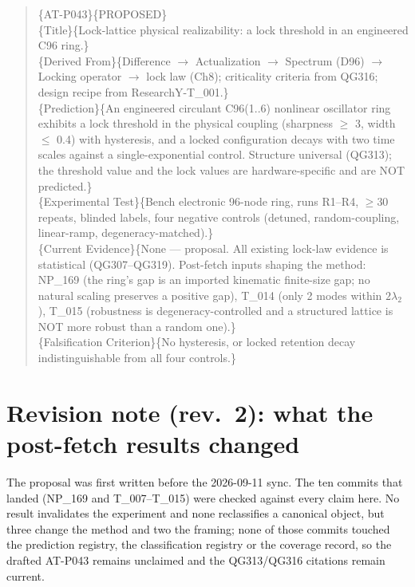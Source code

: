 \documentclass[11pt,a4paper]{article}
\begin{document}
\begin{quote}\raggedright\scriptsize\ttfamily
\string\predstart\{AT-P043\}\{PROPOSED\}\\
\string\pfield\{Title\}\{Lock-lattice physical realizability: a lock threshold in an engineered C96
ring.\}\\
\string\pfield\{Derived From\}\{Difference $\to$ Actualization $\to$ Spectrum (D96) $\to$ Locking
operator $\to$ lock law (Ch8); criticality criteria from QG316; design recipe from ResearchY-T\_001.\}\\
\string\pfield\{Prediction\}\{An engineered circulant C96(1..6) nonlinear oscillator ring exhibits a
lock threshold in the physical coupling (sharpness $\ge$ 3, width $\le$ 0.4) with hysteresis, and a
locked configuration decays with two time scales against a single-exponential control. Structure
universal (QG313); the threshold value and the lock values are hardware-specific and are NOT
predicted.\}\\
\string\pfield\{Experimental Test\}\{Bench electronic 96-node ring, runs R1--R4, $\ge$30 repeats,
blinded labels, four negative controls (detuned, random-coupling, linear-ramp,
degeneracy-matched).\}\\
\string\pfield\{Current Evidence\}\{None --- proposal. All existing lock-law evidence is statistical
(QG307--QG319). Post-fetch inputs shaping the method: NP\_169 (the ring's gap is an imported
kinematic finite-size gap; no natural scaling preserves a positive gap), T\_014 (only 2 modes within
$2\lambda_2$), T\_015 (robustness is degeneracy-controlled and a structured lattice is NOT more
robust than a random one).\}\\
\string\pfield\{Falsification Criterion\}\{No hysteresis, or locked retention decay
indistinguishable from all four controls.\}
\end{quote}

\section{Revision note (rev.\ 2): what the post-fetch results changed}

The proposal was first written before the 2026-09-11 sync. The ten commits that landed (NP\_169 and
T\_007--T\_015) were checked against every claim here. No result invalidates the experiment and none
reclassifies a canonical object, but three change the method and two the framing; none of those
commits touched the prediction registry, the classification registry or the coverage record, so the
drafted AT-P043 remains unclaimed and the QG313/QG316 citations remain current.
\end{document}
